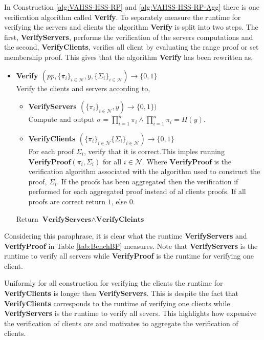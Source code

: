 In Construction \ref{alg:VAHSS-HSS-RP} and \ref{alg:VAHSS-HSS-RP-Agg} there is one verification algorithm called \textbf{Verify}.
To separately measure the runtime for verifying the servers and clients the algorithm \textbf{Verify} is split into two steps. The first, \textbf{VerifyServers}, performs the verification of the servers computations and the second, \textbf{VerifyClients}, verifies all client by evaluating the range proof or set membership proof. This gives that the algorithm \textbf{Verify} has been rewritten as, 
\begin{itemize}
 \item\textbf{Verify $(pp, \{\pi_i\}_{i\in\mathcal{N}},y,\{\Sigma_i\}_{i\in\mathcal{N}})\xrightarrow[]{}\{0,1\}$}\\
 Verify the clients and servers according to, 
 	\begin{itemize}
 	\item \textbf{VerifyServers $(\{\pi_i\}_{i\in\mathcal{N}},y)\xrightarrow[]{}\{0,1\})$}\\
 Compute and output $\sigma= \prod_{i=1}^n \pi_i \wedge \prod_{i=1}^n \pi_i = H(y)$.
 \item \textbf{VerifyClients $(\{\pi_i\}_{i\in\mathcal{N}}\{\Sigma_i\}_{i\in\mathcal{N}})\xrightarrow[]{}\{0,1\}$ }\\
 For each proof $\Sigma_i$, verify that it is correct.This imples running  $\textbf{VerifyProof}(\pi_i, \Sigma_i)$ for all $i\in\mathcal{N}$. Where $\textbf{VerifyProof}$ is the verification algorithm associated with the algorithm used to construct the proof, $\Sigma_i$. If the proofs has been aggregated then the verification if performed for each aggregated proof instead of al clients proofs. If all proofs are correct return $1$, else $0$.  
 \end{itemize}
Return  $\textbf{VerifyServers}\wedge \textbf{VerifyCleints}$
\end{itemize}
Considering this paraphrase, it is clear what the runtime \textbf{VerifyServers} and \textbf{VerifyProof} in Table \ref{tab:BenchBP} measures. Note that \textbf{VerifyServers} is the runtime to verify all servers while \textbf{VerifyProof} is the runtime for verifying one client. 

Uniformly for all construction for verifying the clients the runtime for \textbf{VerifyClients} is longer then \textbf{VerifyServers}. This is despite the fact that \textbf{VerifyClients} corresponds to the runtime of verifying one clients while \textbf{VerifyServers} is the runtime to verify all severs. This highlights how expensive the verification of clients are and motivates to aggregate the verification of clients. 

